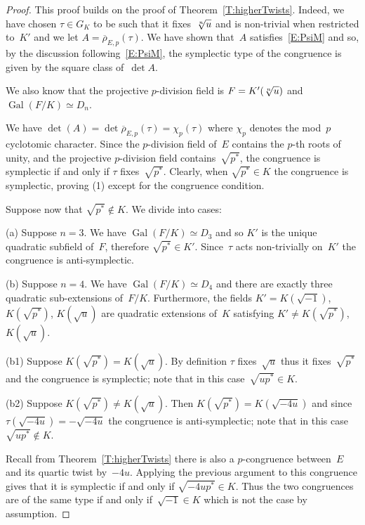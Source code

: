 \documentclass[12pt, reqno]{amsart}
\newcommand{\rhobar}{{\overline{\rho}}}
\DeclareMathOperator{\Gal}{Gal}
\numberwithin{equation}{section}
\theoremstyle{definition}
\theoremstyle{remark}
\begin{document}
\begin{proof}
This proof builds on the proof of Theorem~\ref{T:higherTwists}.
Indeed, we have chosen $\tau\in G_K$ to be such that it fixes~$\root n\of u$ and 
is non-trivial when restricted to~$K'$ and 
we let $A = \rhobar_{E,p}(\tau)$. We have shown that~$A$ satisfies~\eqref{E:PsiM} and so, by the discussion following~\eqref{E:PsiM}, 
the symplectic type of the congruence is given by the square class of~$\det A$. 

We also know that the projective $p$-division field is $F = K'(\root n \of u)$
and $\Gal(F/K) \simeq D_n$.

We have $\det(A)=\det\rhobar_{E,p}(\tau)=\chi_p(\tau)$ where $\chi_p$ denotes the mod~$p$ cyclotomic character.  Since 
the $p$-division field of~$E$ contains the $p$-th roots of unity, and
the projective $p$-division field contains~$\sqrt{p^*}$, the
congruence is symplectic 
if and only if $\tau$ fixes~$\sqrt{p^*}$.
Clearly, when $\sqrt{p^*}\in K$ the congruence is symplectic, proving (1) except for the congruence condition.

Suppose now that $\sqrt{p^*}\notin K$.
We divide into cases:

(a) Suppose $n=3$. 
We have $\Gal(F/K) \simeq D_3$ and so $K'$ is the unique quadratic subfield of~$F$, therefore $\sqrt{p^*} \in K'$. Since~$\tau$ acts non-trivially on~$K'$ the congruence is anti-symplectic.

(b) Suppose $n=4$. We have $\Gal(F/K) \simeq D_4$ and there are exactly three quadratic sub-extensions of~$F/K$.
Furthermore, the fields 
$K'=K(\sqrt{-1})$, $K(\sqrt{p^*})$, $K(\sqrt{u})$ 
are quadratic extensions of~$K$ satisfying
$K' \neq K(\sqrt{p^*})$, $K(\sqrt{u})$. 

(b1) Suppose $K(\sqrt{p^*})=K(\sqrt{u})$.
By definition $\tau$ fixes~$\sqrt{u}$ thus  it fixes~$\sqrt{p^*}$ and the congruence is symplectic; note that in this case~$\sqrt{up^*} \in K$. 
 
(b2) Suppose $K(\sqrt{p^*}) \neq K(\sqrt{u})$. Then 
$K(\sqrt{p^*})=K(\sqrt{-4u})$ and 
since $\tau(\sqrt{-4u}) = - \sqrt{-4u}$
the congruence is anti-symplectic;
note that in this case~$\sqrt{up^*} \not\in K$. 

Recall from Theorem~\ref{T:higherTwists} there is also a
$p$-congruence between~$E$ and its quartic twist by~$-4u$. Applying
the previous argument to this congruence  gives that it is symplectic
if and only
if $\sqrt{-4up^*} \in K$. Thus the two congruences are of the same type if and only if~$\sqrt{-1} \in K$ which is not the case by assumption.


\end{proof}
\end{document}
